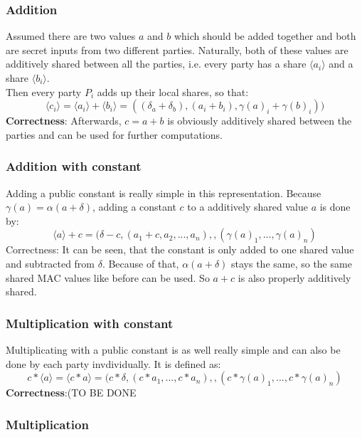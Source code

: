 \documentclass[english,runningheads,a4paper]{llncs}[2018/03/10]
\begin{document}
\subsubsection{Addition}
Assumed there are two values \( a\) and \( b\) which should be added together and both are secret inputs from two different parties. Naturally, both of these values are additively shared between all the parties, i.e. every party has a share \( \langle a_i\rangle\) and a share \( \langle b_i\rangle\).\\

Then every party \( P_i\) adds up their local shares, so that:\\
$$\langle c_i\rangle=\langle a_i\rangle+\langle b_i\rangle=((\delta_a+\delta_b),(a_i+b_i),\gamma (a)_i+\gamma (b)_i))$$
\textbf{Correctness}: Afterwards, \( c=a+b\) is obviously additively shared between the parties and can be used for further computations.\\

\subsubsection{Addition with constant}
Adding a public constant is really simple in this representation. Because \( \gamma (a)=\alpha(a+\delta)\), adding a constant \(c\) to a additively shared value \(a\) is done by:\\
$$\langle a\rangle+c=(\delta-c,(a_1+c,a_2,...,a_n),,(\gamma (a)_1,...,\gamma (a)_n)$$
Correctness: It can be seen, that the constant is only added to one shared value and subtracted from \( \delta\). Because of that, \( \alpha(a+\delta)\) stays the same, so the same shared MAC values like before can be used. So \(a+c\) is also properly additively shared.\\

\subsubsection{Multiplication with constant}
Multiplicating with a public constant is as well really simple and can also be done by each party invdividually. It is defined as:\\
$$c*\langle a\rangle=\langle c*a\rangle=(c*\delta,(c*a_1,...,c*a_n),,(c*\gamma (a)_1,...,c*\gamma (a)_n)$$
\textbf{Correctness}:(TO BE DONE\\

\subsubsection{Multiplication}
\end{document}
